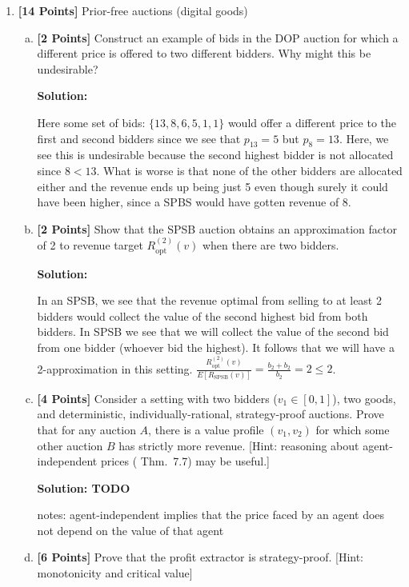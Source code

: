 \documentclass[11pt]{article}
\newcommand{\points}[1]{\textbf{[#1 Points]}}
\begin{document}
\begin{enumerate}[1.]
	\item \points{14}
Prior-free auctions (digital goods)

\begin{enumerate}[(a)]
\item \points{2} Construct an example of bids in the DOP auction for
  which a different price is offered to two different bidders.  Why
  might this be undesirable?

  \textbf{Solution:}

  Here some set of bids: $\{ 13,8,6,5,1,1\}$ would offer a different price to the first and second bidders since we see that $p_{13}=5$ but $p_8=13$. Here, we see this is undesirable because the second highest bidder is not allocated since $8 < 13$. What is worse is that none of the other bidders are allocated either and the revenue ends up being just 5 even though surely it could have been higher, since a SPBS would have gotten revenue of 8.

\item \points{2} Show that the SPSB auction obtains an approximation
  factor of 2 to revenue target $R_{\mathrm{opt}}^{(2)}(v)$ when there
  are two bidders.

  \textbf{Solution:}

  In an SPSB, we see that the revenue optimal from selling to at least 2 bidders would collect the value of the second highest bid from both bidders.  In SPSB we see that we will collect the value of the second bid from one bidder (whoever bid the highest).  It follows that we will have a 2-approximation in this setting.  $\frac{R_{\mathrm{opt}}^{(2)}(v)}{E[R_{\text{SPSB}}(v)]} = \frac{b_2 + b_2}{b_2} = 2 \leq 2$.



\item \points{4} Consider a setting with two bidders ($v_1\in [0,1]$),
  two goods, and deterministic, individually-rational, strategy-proof
  auctions. Prove that for any auction $A$, there is a value profile
  $(v_1,v_2)$ for which some other auction $B$ has strictly more
  revenue. [Hint: reasoning about agent-independent prices (
  Thm.~7.7) may be useful.]

  \textbf{Solution: TODO}

  notes: agent-independent implies that the price faced by an agent does not depend on the value of that agent

\item \points{6} Prove that the profit extractor is strategy-proof.
  [Hint: monotonicity and critical value]


\end{enumerate}
\end{enumerate}
\end{document}
